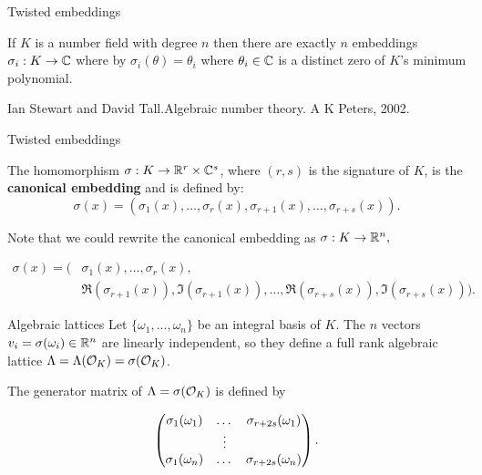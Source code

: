 \documentclass[notheorems, bigger]{beamer}
\begin{document}
\begin{frame}[label={sec:org271b29f}]{Twisted embeddings}
\begin{text}

  \begin{theorem}
    If $K$ is a number field with degree $n$ then there are
    exactly $n$ embeddings $\sigma_i : K \rightarrow \mathbb{C}$ where by $\sigma_i(\theta) =
    \theta_i$ where $\theta_i \in \mathbb{C}$ is a distinct zero of $K$'s
    minimum polynomial.
  \end{theorem}

  \tiny Ian Stewart and David Tall.Algebraic number theory. A K Peters, 2002.
\end{text}
\end{frame}

\begin{frame}[label={sec:orgc11ac01}]{Twisted embeddings}
\begin{text}
  The homomorphism $\sigma: K \rightarrow \mathbb{R}^r \times \mathbb{C}^s$, where $(r,s)$ is the signature of $K$, is the \textbf{canonical embedding} and is defined by:
  \[
  \sigma(x) = \left(\sigma_1(x), \ldots , \sigma_r(x), \sigma_{r+1}(x), \ldots, \sigma_{r+s}(x) \right).
\]

  Note that we could rewrite the canonical embedding as $\sigma : K \rightarrow \mathbb{R}^n,$

  \begin{align*}
    \sigma(x) = (& \sigma_1(x), \ldots , \sigma_r(x), \\
            & \Re(\sigma_{r+1}(x)), \Im(\sigma_{r+1}(x)), \ldots, \Re(\sigma_{r+s}(x)), \Im(\sigma_{r+s}(x)) ).
  \end{align*}

\end{text}
\end{frame}
\begin{frame}[label={sec:org8194f40}]{Algebraic lattices}
Let \(\{\omega_1,...,\omega_n\}\) be an integral basis of \(K\). The \(n\) vectors \(v_i = \sigma(\omega_i)
\in \mathbb{R}^n\) are linearly independent, so they define a full rank algebraic lattice
\(\Lambda = \Lambda(\mathcal{O}_K) = \sigma(\mathcal{O}_K)\).

The generator matrix of \(\Lambda = \sigma(\mathcal{O}_K)\) is defined by

\begin{equation*}
  \label{definition:gen-matrix-alg-lattices}
  \begin{pmatrix}
    \sigma_1(\omega_1) & $\dots$ &  \sigma_{r+2s}(\omega_1) \\
    & \vdots & \\
    \sigma_1(\omega_n) & $\dots$ & \sigma_{r+2s}(\omega_n) \\
  \end{pmatrix}.  
\end{equation*}
\end{frame}
\end{document}
